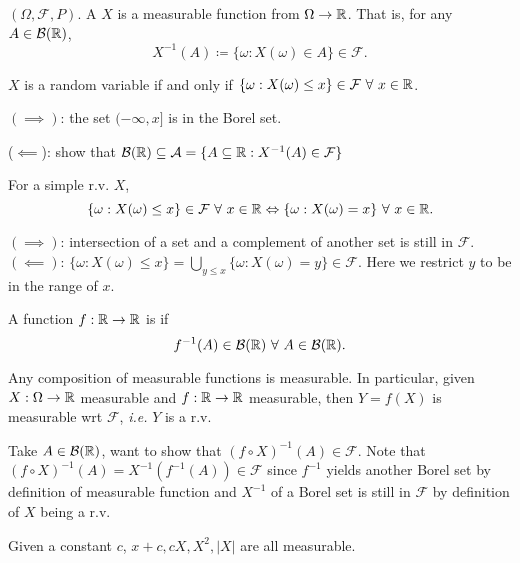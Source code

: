 \documentclass[class=article,crop=false]{standalone}
\begin{document}
\begin{defn}
	$(\Omega,\mathcal{F},P)$. A  $ X$ is a measurable function from $ \Omega \to \mathbb{R}$. That is, for any $ A \in \mathcal{B}(\mathbb{R})$, 
	\[
		X^{-1}(A) \coloneqq \{\omega: X(\omega) \in A\}  \in \mathcal{F}
	.\] 
\end{defn}
\begin{thm}[]
	$ X$ is a random variable if and only if  $ \{\omega: X(\omega) \leq x\} \in \mathcal{F} \ \forall \ x \in \mathbb{R}$.
\end{thm}
 \begin{prf}
	 $ (\implies)$: the set $ (-\infty,x]$ is in the Borel set.

	 ($ \impliedby$): show that $ \mathcal{B}( \mathbb{R}) \subseteq \mathcal{A} = \{A \subseteq \mathbb{R}: X^{-1}(A) \in \mathcal{F}\} $ 
 \end{prf}
\begin{claim}[]
For a simple r.v. $ X$,
 \[
	 \{\omega:X(\omega) \leq x\} \in \mathcal{F} \ \forall \ x \in \mathbb{R} \Leftrightarrow \{\omega:X(\omega)=x\} \ \forall \ x \in \mathbb{R}
.\] 
\end{claim}
\begin{prf}
	$ (\implies)$: intersection of a set and a complement of another set is still in $ \mathcal{F}$.
	$ (\impliedby)$: $ \{\omega: X(\omega) \leq x\} = \bigcup _{y \leq x} \{\omega:X(\omega)=y\}   \in \mathcal{F}$. Here we restrict $ y$ to be in the range of  $ x$.
\end{prf}

\begin{defn}
	A function $ f: \mathbb{R} \to \mathbb{R}$ is  if
\[
	f^{-1}(A) \in \mathcal{B}( \rr) \ \forall \ A \in \mathcal{B}( \rr)
.\] 
\end{defn}

\begin{thm}[]
	Any composition of measurable functions is measurable. In particular, given $ X: \Omega \to \mathbb{R}$ measurable and $ f: \mathbb{R} \to \mathbb{R}$ measurable, then $ Y=f(X)$ is measurable wrt  $ \mathcal{F}$, \emph{i.e.} $ Y$ is a r.v.
\end{thm}
\begin{prf}
	Take $ A \in \mathcal{B}( \mathbb{R})$, want to show that $ (f \circ X)^{-1}(A) \in \mathcal{F}$. Note that $ (f \circ X)^{-1}(A)=X^{-1}(f^{-1}(A)) \in \mathcal{F}$ since $ f^{-1}$ yields another Borel set by definition of measurable function and $ X^{-1}$ of a Borel set is still in $ \mathcal{F}$ by definition of $ X$ being a r.v.
\end{prf}
\begin{note}[]
Given a constant $ c$, $ x+c,cX,X^2,|X|$ are all measurable.
\end{note}
\end{document}

